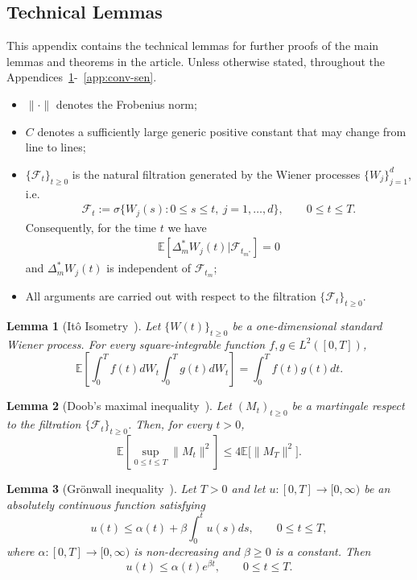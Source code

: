 \documentclass[11pt, a4paper, onecolumn]{article}
\newcommand{\E}{\mathbb{E}}
\newcommand{\ms}{{m^*}}
\newcommand{\Dms}{{\Delta^{*}_{m}}}
\newtheorem{lemma}{Lemma}
\begin{document}
\begin{appendices}
\section{Technical Lemmas}\label{app:tech}

This appendix contains the technical lemmas for further proofs of the main lemmas and theorems in the article. Unless otherwise stated, throughout the Appendices~\ref{app:tech}-~\ref{app:conv-sen}.
\begin{itemize}
    \item $\|\cdot\|$ denotes the Frobenius norm;
    \item $C$ denotes a sufficiently large generic positive constant that may change from line to lines;
    \item $\{\mathcal F_t\}_{t\ge0}$ is the natural filtration generated by the Wiener processes $\{W_j\}_{j=1}^d$, i.e.
      \begin{align*}
          \mathcal F_t :=\sigma\bigl\{W_j(s) : 0\le s\le t,\ j=1,\dots,d\bigr\},
          \qquad 0 \le t \le T.
      \end{align*}
    Consequently, for the time $t$ we have
    \begin{align*}
    \E[\Dms W_j(t)|\mathcal F_{t_\ms}] =0
    \end{align*}
  and $\Dms W_j(t)$ is independent of $\mathcal F_{t_m}$;
  \item All arguments are carried out with respect to the filtration $\{\mathcal F_t\}_{t\ge0}$.
\end{itemize}

\begin{lemma}[It\^o Isometry~\cite{le2016brownian}]\label{lem:ito-isometry}
Let \(\{W(t)\}_{t\ge 0}\) be a one-dimensional standard Wiener process.  
For every square-integrable function \(f,g\in L^{2}([0,T])\),
\[
\mathbb{E}\left[\int_{0}^{T} f(t)dW_t \int_{0}^{T} g(t)dW_t\right] =  \int_{0}^{T} f(t)g(t) dt.
\]
\end{lemma}


\begin{lemma}[Doob’s maximal inequality~\cite{le2016brownian}]\label{lemma:doob}
Let $(M_{t})_{t\ge0}$ be a martingale respect to the filtration $\{\mathcal F_t\}_{t\ge0}$.  
Then, for every $t>0$,
\[
\mathbb E\left[\sup_{0\le t\le T}\|M_{t}\|^{2}\right] \le 4 \mathbb E\bigl[\|M_{T}\|^{2}\bigr].
\]
\end{lemma}

\begin{lemma}[Gr\"onwall inequality~\cite{gronwall1919note}]\label{lemma:gronwall}
Let $T>0$ and let $u:[0,T]\to[0,\infty)$ be an absolutely continuous function satisfying
\[
u(t)\le \alpha(t)+\beta\int_{0}^{t}u(s)ds,\qquad 0\le t\le T,
\]
where $\alpha:[0,T]\to[0,\infty)$ is non-decreasing and $\beta\ge 0$ is a constant.  
Then
\[
u(t)\le \alpha(t)e^{\beta t},\qquad 0\le t\le T.
\]
\end{lemma}


\end{appendices}
\end{document}
